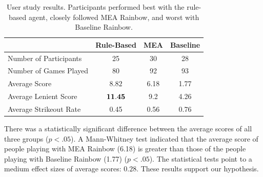 \documentclass[letterpaper]{article} %
\begin{document}
\begin{table}[t]
\footnotesize
\centering
\begin{tabular}{ l c c c }
 \toprule
  & Rule-Based &  MEA & Baseline\\
 \midrule
 Number of Participants & 25 & 30 & 28 \\
 Number of Games Played & 80 & 92 & 93 \\
 Average Score & ${8.82}$ & 6.18 & 1.77 \\ [1ex]
 Average Lenient Score & $\bf{11.45}$ & 9.2 & 4.26 \\ [1ex]
 Average Strikeout Rate & 0.45 & 0.56 & 0.76 \\
 \bottomrule
\end{tabular}
    \caption{User study  results.
    Participants performed best with the rule-based agent, closely followed MEA Rainbow, and worst with Baseline Rainbow. }
\label{user_results}
\end{table}
There was a statistically significant difference between the average scores of all three groups %
($p < .05$).
A Mann-Whitney test indicated that the average score of people playing with MEA Rainbow (6.18) is greater than those of the people playing with Baseline Rainbow (1.77) ($p < .05$).
The statistical tests point to a medium effect sizes of average scores: $0.28$.
These
results
support our hypothesis.
\end{document}
